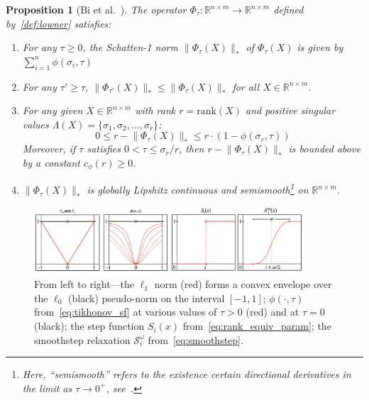 \documentclass[10pt]{article}
\numberwithin{equation}{section}
\newcommand{\+}{%
	\raisebox{0.18ex}{\scaleobj{0.55}{+}}
}
\newtheorem{proposition}{Proposition}
\theoremstyle{definition}
\newtheorem{remark}{Remark}
\theoremstyle{definition}
\begin{document}
\begin{proposition}[Bi et al.~\cite{bi2013approximation}] The operator $\Phi_\tau: \mathbb{R}^{n \times m} \to \mathbb{R}^{n \times m}$ defined by~\eqref{def:lowner} satisfies: 
	\begin{enumerate}
		\item For any $\tau \geq 0$, the Schatten-1 norm $\lVert \Phi_\tau(X) \rVert_\ast$ of  $\Phi_\tau(X)$ is given by $\sum\limits_{i=1}^n \phi(\sigma_i, \tau)$
		\item For any $\tau' \geq \tau$, $\lVert \Phi_{\tau'}(X) \rVert_\ast \leq \lVert \Phi_{\tau}(X) \rVert_\ast$ for all $X \in \mathbb{R}^{n \times m}$.
		\item For any given $X \in \mathbb{R}^{n \times m}$ with rank $r = \mathrm{rank}(X)$ and positive singular values $\Lambda(X) = \{\sigma_1, \sigma_2, \dots, \sigma_r\}$:
		$$ 0 \leq r - \lVert \Phi_\tau(X) \rVert_\ast \leq r\cdot (1 - \phi(\sigma_r, \tau))$$
		Moreover, if $\tau$ satisfies $0 < \tau \leq \sigma_r / r$, then $r - \lVert \Phi_\tau(X) \rVert_\ast$ is bounded above by a constant $c_\phi(r) \geq 0$. %
		\item $\lVert \Phi_\tau(X) \rVert_\ast$ is globally Lipshitz continuous and semismooth\footnote{Here, ``semismooth'' refers to the existence certain directional derivatives in the limit as $\tau \to 0^+$, see~\cite{bhatia2013matrix, bi2013approximation}.} on $\mathbb{R}^{n \times m}$.
	\end{enumerate}
\end{proposition}
\begin{figure}
\centering
	\includegraphics[width=0.90\textwidth]{cont_relax}
	\caption{From left to right---the $\ell_1$ norm (red) forms a convex envelope over the $\ell_0$ (black) pseudo-norm on the interval $[-1, 1]$; 
	$\phi(\cdot, \tau)$ from~\eqref{eq:tikhonov_sf} at various values of $\tau > 0$ (red) and at $\tau = 0$ (black); 
	the step function $S_i(x)$ from~\eqref{eq:rank_equiv_param}; 
	the smoothstep relaxation $\mathcal{S}_i^{\omega}$ from~\eqref{eq:smoothstep}.
	}
	\label{fig:smoothstep}
\end{figure}
\end{document}
